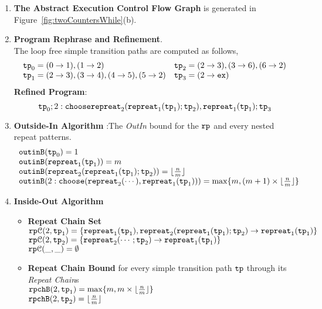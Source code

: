 \begin{enumerate}
  \item  \textbf{The Abstract Execution Control Flow Graph} is generated in Figure~\ref{fig:twoCountersWhile}(b).

  \item \textbf{Program Rephrase and Refinement}. 
  \\
  The loop free simple transition paths are computed as follows,
  \[
    \begin{array}{ll}
\mathtt{tp}_0 = (0 \to 1), (1 \to 2)
&
\mathtt{tp}_2 = (2 \to 3), (3 \to 6), (6 \to 2)
\\
\mathtt{tp}_1 = (2 \to 3), (3 \to 4), (4 \to 5), (5 \to 2)
&
\mathtt{tp}_3 = (2 \to \mathtt{ex})
\end{array}
\]
\textbf{Refined Program}:
\[
  \mathtt{tp}_0 ; 2: \mathtt{choose}{\mathtt{repreat}_2(\mathtt{repreat}_1(\mathtt{tp}_1); \mathtt{tp}_2) , \mathtt{repreat}_1(\mathtt{tp}_1) }; \mathtt{tp}_3
  \]
  \item \textbf{Outside-In Algorithm} :The \emph{OutIn} bound for the $\mathtt{rp}$ and every nested repeat patterns.
  \[
    \begin{array}{l}
        \mathtt{outinB}(\mathtt{tp}_0) = 1
        \\
        \mathtt{outinB}(\mathtt{repreat}_1(\mathtt{tp}_1)) = m 
        \\
        \mathtt{outinB}(\mathtt{repreat}_2(\mathtt{repreat}_1(\mathtt{tp}_1); \mathtt{tp}_2)) = \lfloor\frac{n}{m}\rfloor
        \\
        \mathtt{outinB}(2: \mathtt{choose}(\mathtt{repreat}_2(\cdots), \mathtt{repreat}_1(\mathtt{tp}_1))) 
        = \max\{m, (m  + 1)\times \lfloor\frac{n}{m}\rfloor\}
\end{array}
\]
\item \textbf{Inside-Out Algorithm}
\begin{itemize}
  \item \textbf{Repeat Chain Set}
  \\
  $\mathtt{rp}\mathcal{C}(2, \mathtt{tp}_1) = \{\mathtt{repreat}_1(\mathtt{tp}_1), \mathtt{repreat}_2(\mathtt{repreat}_1(\mathtt{tp}_1); \mathtt{tp}_2) \to \mathtt{repreat}_1(\mathtt{tp}_1)\}$ \\
  $\mathtt{rp}\mathcal{C}(2, \mathtt{tp}_2) = \{\mathtt{repreat}_2(\cdots; \mathtt{tp}_2) \to \mathtt{repreat}_1(\mathtt{tp}_1)\}$ \\
  $\mathtt{rp}\mathcal{C}(\_, \_) = \emptyset$ 
  \item \textbf{Repeat Chain Bound} for every simple transition path $\mathtt{tp}$ through its \emph{Repeat Chain}s
  \\
  $\mathtt{rpchB}(2, \mathtt{tp}_1) = \max\{m, m \times \lfloor\frac{n}{m}\rfloor\}$ \\
  $\mathtt{rpchB}(2, \mathtt{tp}_2) = \lfloor\frac{n}{m}\rfloor$ 

\end{itemize}
\end{enumerate}
